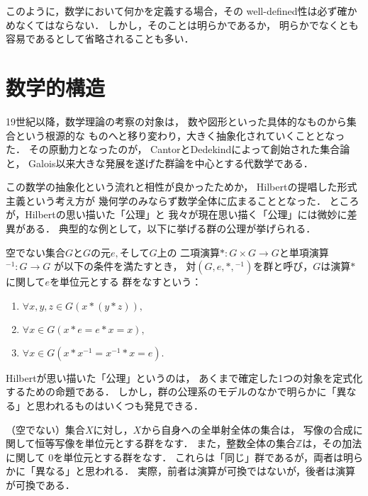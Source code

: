   このように，数学において何かを定義する場合，その
  well-defined性は必ず確かめなくてはならない．
  しかし，そのことは明らかであるか，
  明らかでなくとも容易であるとして省略されることも多い．


\section{数学的構造}
\label{sec:structure}
  
  19世紀以降，数学理論の考察の対象は，
  数や図形といった具体的なものから集合という根源的な
  ものへと移り変わり，大きく抽象化されていくこととなった．
  その原動力となったのが，
  CantorとDedekindによって創始された集合論と，
  Galois以来大きな発展を遂げた群論を中心とする代数学である．
  
  この数学の抽象化という流れと相性が良かったためか，
  Hilbertの提唱した形式主義という考え方が
  幾何学のみならず数学全体に広まることとなった．
  ところが，Hilbertの思い描いた「公理」と
  我々が現在思い描く「公理」には微妙に差異がある．
  典型的な例として，以下に挙げる群の公理が挙げられる．
  \begin{axiom}[群の公理] \label{axiom:group}
    空でない集合$G$と$G$の元$e,$そして$G$上の
    二項演算$\ast : G \times G \longrightarrow G$と単項演算${} ^{-1} : G \to G$
    が以下の条件を満たすとき，
    対$(G,e, \ast , {} ^{-1})$を群と呼び，$G$は演算$\ast$に関して$e$を単位元とする
    群をなすという：
    \begin{enumerate}[(1) ]
      \item $\forall x, y, z \in G (x \ast ( y \ast z)) ,$
      \item $ \forall x \in G (x \ast e = e \ast x = x),$
      \item $\forall x \in G (x \ast x^{-1} = x^{-1} \ast x = e).$
    \end{enumerate}
  \end{axiom}
  Hilbertが思い描いた「公理」というのは，
  あくまで確定した1つの対象を定式化するための命題である．
  しかし，群の公理系のモデルのなかで明らかに「異なる」と思われるものはいくつも発見できる．

  \begin{ex} \label{ex:groupmodel}
    （空でない）集合$X$に対し，$X$から自身への全単射全体の集合は，
    写像の合成に関して恒等写像を単位元とする群をなす．
    また，整数全体の集合$\mathbb{Z}$は，その加法に関して
    $0$を単位元とする群をなす．
    これらは「同じ」群であるが，両者は明らかに「異なる」と思われる．
    実際，前者は演算が可換ではないが，後者は演算が可換である．
  \end{ex}

